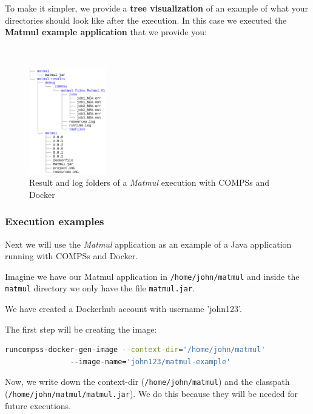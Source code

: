 To make it simpler, we provide a \textbf{tree visualization} of an example of what your directories should look like after the execution.
In this case we executed the \textbf{Matmul example application} that we provide you:

~ \newline

\begin{figure}[!ht]
  \centering
    \includegraphics[width=0.3\textwidth]{./Sections/5_Execution_Platforms/Figures/docker-matmul-results-tree.png}
    \caption{Result and log folders of a \textit{Matmul} execution with COMPSs and Docker}
    \label{fig:compss_docker_results}
\end{figure}


\clearpage
\subsubsection{Execution examples}

  Next we will use the \textit{Matmul} application as an example of a Java application running with COMPSs and Docker.

Imagine we have our Matmul application in \texttt{/home/john/matmul} and inside the \texttt{matmul} directory we only have the file \texttt{matmul.jar}.

We have created a Dockerhub account with username 'john123'.

The first step will be creating the image:
\begin{lstlisting}[language=bash]
runcompss-docker-gen-image --context-dir='/home/john/matmul'
			   --image-name='john123/matmul-example'
\end{lstlisting}

Now, we write down the context-dir (\texttt{/home/john/matmul}) and the classpath \\ (\texttt{/home/john/matmul/matmul.jar}). We do this because they will be needed for future executions. \\

